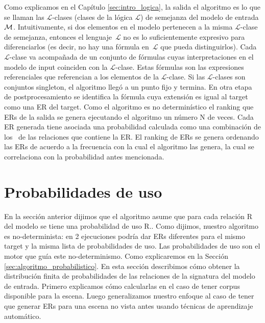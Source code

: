 Como explicamos en el Cap\'itulo \ref{sec:intro_logica}, la salida el algoritmo es lo que se llaman las $\mathcal {L}$-clases (clases de la l\'ogica $\mathcal {L}$) de semejanza del modelo de entrada $\mathcal{M} $. Intuitivamente, si dos elementos en el modelo pertenecen a la misma $\mathcal {L}$-clase de semejanza, entonces el lenguaje~$\mathcal {L}$ no es lo suficientemente expresivo para diferenciarlos (es decir, no hay una f\'ormula en~$\mathcal {L }$ que pueda distinguirlos). Cada  $\mathcal {L}$-clase va acompa\~nada de un conjunto de f\'ormulas cuyas interpretaciones en el modelo de input coinciden con la $\mathcal {L}$-clase. Estas f\'ormulas son las expresiones referenciales que referencian a los elementos de la $\mathcal {L}$-clase. Si las $\mathcal {L}$-clases son conjuntos singleton, el algoritmo lleg\'o a un punto fijo y termina. En otra etapa de postprocesamiento se identifica la f\'ormula cuya extensi\'on es igual al target como una ER del target. Como el algoritmo es no determin\'istico el ranking que ERs de la salida se genera ejecutando el algoritmo un n\'umero N de veces. Cada ER generada tiene asociada una probabilidad calculada como una combinaci\'on de los \puse\ de las relaciones que contiene la ER. El ranking de ERs se genera ordenando las ERs de acuerdo a la frecuencia con la cual el algoritmo las genera, la cual se correlaciona con la probabilidad antes mencionada.


\section{Probabilidades de uso}
\label{sec:learning}

En la secci\'on anterior dijimos que el algoritmo asume que para cada relaci\'on R del modelo se tiene una probabilidad de uso R.\puse. Como dijimos, nuestro algoritmo es no-determinista: en 2 ejecuciones podr\'ia dar ERs diferentes para el mismo target y la misma lista de probabilidades de uso. Las probabilidades de uso son el motor que gu\'ia este no-determinismo. Como explicaremos en la Secci\'on \ref{sec:algoritmo_probabilistico}. En esta secci\'on describimos c\'omo obtener la distribuci\'on finita de probabilidades de las relaciones de la signatura del modelo de entrada. Primero explicamos c\'omo calcularlas en el caso de tener corpus disponible para la escena. Luego generalizamos nuestro enfoque al caso de tener que generar ERs para una escena no vista antes usando t\'ecnicas de aprendizaje autom\'atico.  

